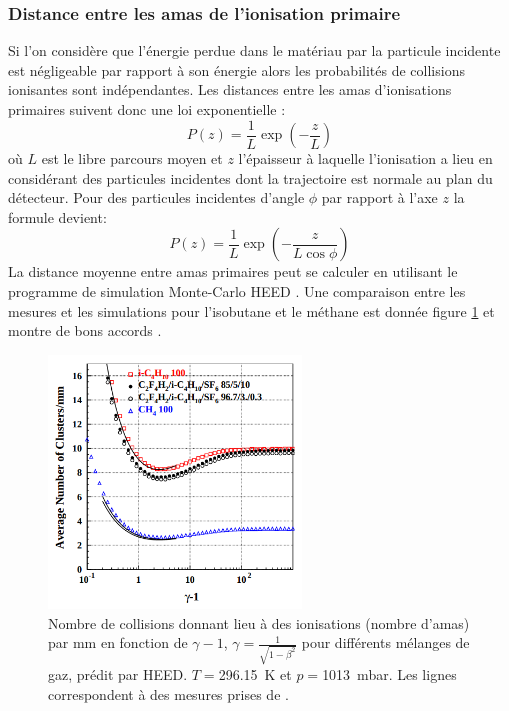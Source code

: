 \subsubsection{Distance entre les amas de l'ionisation primaire}
Si l'on considère que l'énergie perdue dans le matériau par la particule incidente est négligeable par rapport à son énergie alors les probabilités de collisions ionisantes sont indépendantes. Les distances entre les amas d'ionisations primaires suivent donc une loi exponentielle :
\begin{equation}
P(z)=\frac{1}{L}\exp\left(-\frac{z}{L}\right)
\end{equation} 
où $L$ est le libre parcours moyen et $z$ l'épaisseur à laquelle l'ionisation a lieu en considérant des particules incidentes dont la trajectoire est normale au plan du détecteur. Pour des particules incidentes d'angle $\phi$ par rapport à l'axe $z$ la formule devient:
\begin{equation}
P(z)=\frac{1}{L}\exp\left(-\frac{z}{L\cos\phi}\right)
\end{equation}
La distance moyenne entre amas primaires peut se calculer en utilisant le programme de simulation Monte-Carlo HEED \cite{HEED}. Une comparaison entre les mesures et les simulations pour l'isobutane et le méthane est donnée figure \ref{lambda} et montre de bons accords \cite{2004NIMPA}.  

\begin{figure}[ht!]
	\centering
	\includegraphics[width=0.60\textwidth]{RPC/lambda.png}
	\captionsetup{type=subfigure}\caption{Nombre de collisions donnant lieu à des ionisations (nombre d'amas) par \si{\milli\meter} en fonction de $\gamma-1$, $\gamma=\frac{1}{\sqrt{1-\beta^{2}}}$ pour différents mélanges de gaz, prédit par HEED. $T=$\SI{296.15}{\kelvin} et $p=$\SI{1013}{\milli\bar}. Les lignes correspondent à des mesures prises de \cite{PhysRevA.6.1507}.  }
	\label{lambda}
\end{figure}

